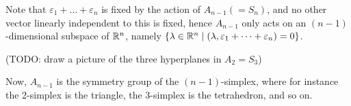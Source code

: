Note that $\varepsilon_1 + \dots + \varepsilon_n$ is fixed by the action of
$A_{n-1} (= S_n)$, and no other vector linearly independent to this is fixed,
hence $A_{n-1}$ only acts on an $(n-1)$-dimensional subspace of $\mathbb{R}^n$, namely
$\{\lambda \in \mathbb{R}^n \mid (\lambda, \varepsilon_1 + \dots + \varepsilon_n) = 0\}$.

(TODO: draw a picture of the three hyperplanes in $A_2 = S_3$)

Now, $A_{n-1}$ is the symmetry group of the $(n-1)$-simplex, where for instance
the 2-simplex is the triangle, the 3-simplex is the tetrahedron, and so on.
